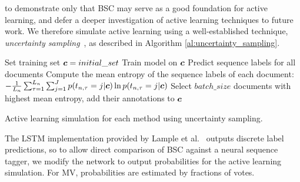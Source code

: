  to demonstrate only that BSC may serve as a good foundation for active learning,
 and defer a deeper investigation of active learning techniques to future work.
 We therefore simulate active learning using a well-established technique, \emph{uncertainty sampling}~\cite{settles2008analysis,settles2010active},
 as described in Algorithm \ref{al:uncertainty_sampling}.
 \begin{algorithm}
 \DontPrintSemicolon
  \nl Set training set $\boldsymbol c=initial\_set$ \;
  {
  \nl Train model on $\boldsymbol c$ \;
  \nl Predict sequence labels for all documents\;
  \nl Compute the mean entropy of the sequence labels of each document: 
  $-\frac{1}{L_n} \sum_{\tau=1}^{L_n}
  \sum_{j=1}^J
  p(t_{n,\tau} = j | \boldsymbol c) \ln p(t_{n,\tau} = j | \boldsymbol c) $
  \;
  \nl Select $batch\_size$ documents with highest mean entropy, add their annotations to $\boldsymbol c$\;
  }
 \caption{Active learning simulation for each method using uncertainty sampling.}
 \label{al:uncertainty_sampling}
 \end{algorithm}
 The LSTM implementation provided by Lample et al.~ 
 outputs discrete label predictions, so to allow direct comparison of BSC against a neural sequence tagger,
 we modify the network to output probabilities for the active learning simulation. For MV, probabilities
 are estimated by fractions of votes.

